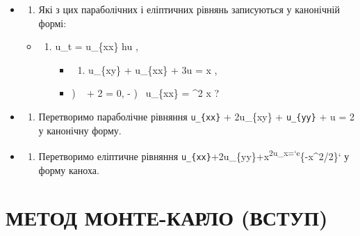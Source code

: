 \documentclass[
  ukrainian,
]{article}
\providecommand{\tightlist}{%
  \setlength{\itemsep}{0pt}\setlength{\parskip}{0pt}}
\begin{document}
\begin{itemize}
\item
  \begin{enumerate}
  \def\labelenumi{\arabic{enumi}.}
  \tightlist
  \item
    Які з цих параболічних і еліптичних рівнянь записуються у канонічній
    формі:
  \end{enumerate}

  \begin{itemize}
  \tightlist
  \item
    \begin{enumerate}
    \def\labelenumi{\alph{enumi})}
    \tightlist
    \item
      u\_t = u\_\{xx\} hu ,

      \begin{itemize}
      \tightlist
      \item
        \begin{enumerate}
        \def\labelenumii{\arabic{enumii})}
        \setcounter{enumii}{5}
        \tightlist
        \item
          u\_\{xy\} + u\_\{xx\} + 3u = \sin x ,
        \end{enumerate}
      \item
        ) ~ + 2 = 0, - )
        ~u\_\{xx\} = \sin\^{}2 x ?
      \end{itemize}
    \end{enumerate}
  \end{itemize}
\item
  \begin{enumerate}
  \def\labelenumi{\arabic{enumi}.}
  \setcounter{enumi}{1}
  \tightlist
  \item
    Перетворимо параболічне рівняння \texttt{u\_\{xx\}} + 2u\_\{xy\} +
    \texttt{u\_\{yy\}} + u = 2 у канонічну форму.
  \end{enumerate}
\item
  \begin{enumerate}
  \def\labelenumi{\arabic{enumi}.}
  \setcounter{enumi}{2}
  \tightlist
  \item
    Перетворимо еліптичне рівняння
    \texttt{u\_\{xx\}}+2u\_\{yy\}+x\textsuperscript{2u\_x=`e}\{-x\^{}2/2\}`
    у форму каноха.
  \end{enumerate}
\end{itemize}

\section{МЕТОД МОНТЕ-КАРЛО
(ВСТУП)}\label{ux43cux435ux442ux43eux434-ux43cux43eux43dux442ux435-ux43aux430ux440ux43bux43e-ux432ux441ux442ux443ux43f}
\end{document}
